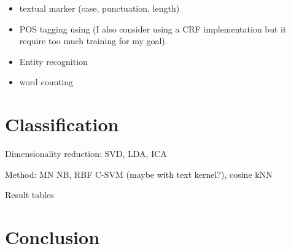 \begin{itemize}
\item textual marker (case, punctuation, length)
\item POS tagging using \autocite{bird2009nltk} (I also consider
	using a CRF implementation \autocite[for instance][]{CRFsuite} but it
	require too much training for my goal).
\item Entity recognition
\item word counting
\end{itemize}

\section{Classification}
Dimensionality reduction: SVD, LDA, ICA

Method: MN NB, RBF C-SVM (maybe with text kernel?), cosine kNN

Result tables

\section{Conclusion}
